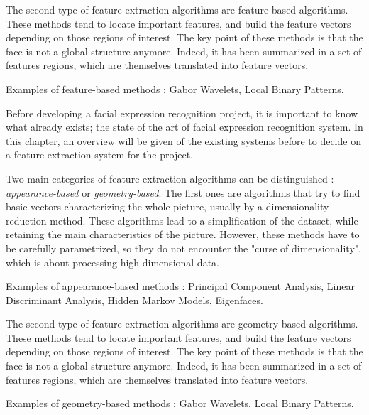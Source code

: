 \noindent The second type of feature extraction algorithms are feature-based algorithms. These methods tend to locate important features, and build the feature vectors depending on those regions of interest. The key point of these methods is that the face is not a global structure anymore. Indeed, it has been summarized in a set of features regions, which are themselves translated into feature vectors.
\vspace{\baselineskip}

\noindent Examples of feature-based methods : Gabor Wavelets, Local Binary Patterns.
\newline

\vspace{\baselineskip}
\noindent Before developing a facial expression recognition project, it is important to know what already exists; the state of the art of facial expression recognition system. In this chapter, an overview will be given of the existing systems before to decide on a feature extraction system for the project.
\newline

\noindent Two main categories of feature extraction algorithms can be distinguished : \textit{appearance-based} or \textit{geometry-based}. The first ones are algorithms that try to find basic vectors characterizing the whole picture, usually by a dimensionality reduction method. These algorithms lead to a simplification of the dataset, while retaining the main characteristics of the picture. However, these methods have to be carefully parametrized, so they do not encounter the "curse of dimensionality", which is about processing high-dimensional data.
\vspace{\baselineskip}

\noindent Examples of appearance-based methods : Principal Component Analysis, Linear Discriminant Analysis, Hidden Markov Models, Eigenfaces.
\newline

\noindent The second type of feature extraction algorithms are geometry-based algorithms. These methods tend to locate important features, and build the feature vectors depending on those regions of interest. The key point of these methods is that the face is not a global structure anymore. Indeed, it has been summarized in a set of features regions, which are themselves translated into feature vectors.
\vspace{\baselineskip}

\noindent Examples of geometry-based methods : Gabor Wavelets, Local Binary Patterns.
\newline

